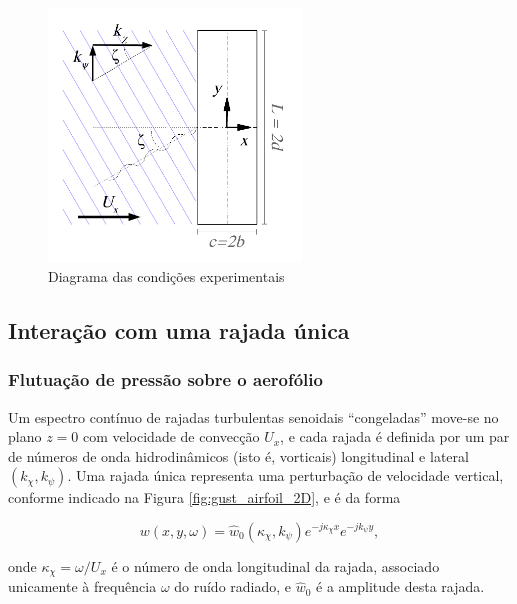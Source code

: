 \documentclass[a4paper, 11pt, twoside]{article}
\begin{document}
\begin{figure}[htbp]
	\centering
	\includegraphics[width=0.6\textwidth]{../figures/Oblique_Gust_aerofoil.pdf}
	\caption{Diagrama das condições experimentais}
	\label{fig:experimental_setup}
\end{figure}

\subsection{Interação com uma rajada única}

\subsubsection{Flutuação de pressão sobre o aerofólio}

Um espectro contínuo de rajadas turbulentas senoidais ``congeladas'' move-se no plano $z=0$ com velocidade de convecção $U_x$, e cada rajada é definida por um par de números de onda hidrodinâmicos (isto é, vorticais) longitudinal e lateral $(k_\chi, k_\psi)$. Uma rajada única representa uma perturbação de velocidade vertical, conforme indicado na Figura \ref{fig:gust_airfoil_2D}, e é da forma

\begin{equation}
w(x, y, \omega) = \hat{w}_0(\kappa_\chi, k_\psi) e^{-j\kappa_\chi x} e^{-j k_\psi y },
\end{equation}

\noindent onde $\kappa_\chi = \omega/U_x$ é o número de onda longitudinal da rajada, associado unicamente à frequência $\omega$ do ruído radiado, e $\hat{w}_0$ é a amplitude desta rajada. %
\end{document}
